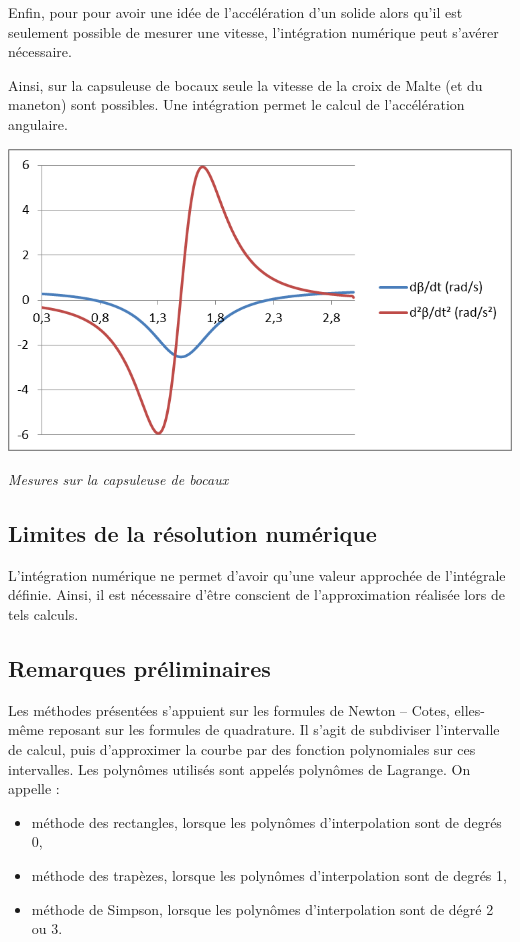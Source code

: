 \documentclass[11pt]{article}
\begin{document}
\begin{minipage}[c]{.47\linewidth}
Enfin, pour pour avoir une idée de l'accélération d'un solide alors qu'il est seulement possible de mesurer une vitesse, l'intégration numérique peut s'avérer nécessaire.

Ainsi, sur la capsuleuse de bocaux seule la vitesse de la croix de Malte (et du maneton) sont possibles. Une intégration permet le calcul de l'accélération angulaire.
\end{minipage}\hfill
\begin{minipage}[c]{.47\linewidth}
\begin{center}
\includegraphics[width=.95\textwidth]{images/capsuleuse}

\textit{Mesures sur la capsuleuse de bocaux}
\end{center}
\end{minipage}

\subsection{Limites de la résolution numérique}
\begin{warn}
L'intégration numérique ne permet d'avoir qu'une valeur approchée de l'intégrale définie. 
Ainsi, il est nécessaire d'être conscient de l'approximation réalisée lors de tels calculs.
\end{warn}

\subsection{Remarques préliminaires}

Les méthodes présentées s'appuient sur les formules de Newton -- Cotes, elles-même reposant sur les formules de quadrature. Il s'agit de subdiviser l'intervalle de calcul, puis d'approximer la courbe par des fonction polynomiales sur ces intervalles. Les polynômes utilisés sont appelés polynômes de Lagrange. On appelle :
\begin{itemize}
\item méthode des rectangles, lorsque les polynômes d'interpolation sont de degrés 0,
\item méthode des trapèzes, lorsque les polynômes d'interpolation sont de degrés 1,
\item méthode de Simpson, lorsque les polynômes d'interpolation sont de dégré 2 ou 3. 
\end{itemize}
\end{document}
